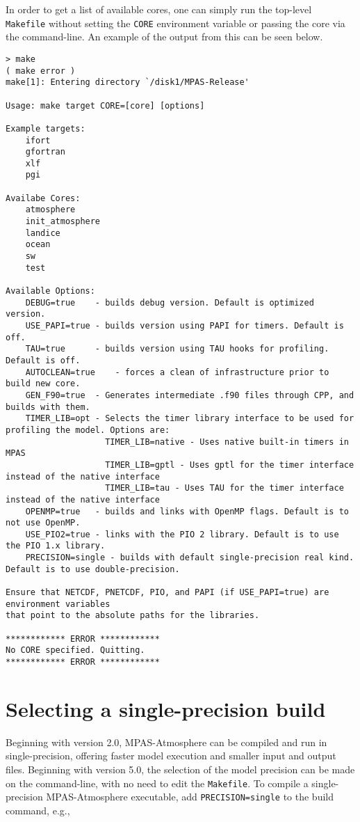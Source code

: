 In order to get a list of available cores, one can simply run the top-level {\tt
Makefile} without setting the {\tt CORE} environment variable or passing the
core via the command-line. An example of the output from this can be seen
below.

{\small
\begin{verbatim}
> make
( make error )
make[1]: Entering directory `/disk1/MPAS-Release'

Usage: make target CORE=[core] [options]

Example targets:
    ifort
    gfortran
    xlf
    pgi

Availabe Cores:
    atmosphere
    init_atmosphere
    landice
    ocean
    sw
    test

Available Options:
    DEBUG=true    - builds debug version. Default is optimized version.
    USE_PAPI=true - builds version using PAPI for timers. Default is off.
    TAU=true      - builds version using TAU hooks for profiling. Default is off.
    AUTOCLEAN=true    - forces a clean of infrastructure prior to build new core.
    GEN_F90=true  - Generates intermediate .f90 files through CPP, and builds with them.
    TIMER_LIB=opt - Selects the timer library interface to be used for profiling the model. Options are:
                    TIMER_LIB=native - Uses native built-in timers in MPAS
                    TIMER_LIB=gptl - Uses gptl for the timer interface instead of the native interface
                    TIMER_LIB=tau - Uses TAU for the timer interface instead of the native interface
    OPENMP=true   - builds and links with OpenMP flags. Default is to not use OpenMP.
    USE_PIO2=true - links with the PIO 2 library. Default is to use the PIO 1.x library.
    PRECISION=single - builds with default single-precision real kind. Default is to use double-precision.

Ensure that NETCDF, PNETCDF, PIO, and PAPI (if USE_PAPI=true) are environment variables
that point to the absolute paths for the libraries.

************ ERROR ************
No CORE specified. Quitting.
************ ERROR ************
\end{verbatim}
}

\section{Selecting a single-precision build}

Beginning with version 2.0, MPAS-Atmosphere can be compiled and run in single-precision, offering faster 
model execution and smaller input and output files. Beginning with version 5.0, the selection of the
model precision can be made on the command-line, with no need to edit the {\tt Makefile}.
To compile a single-precision MPAS-Atmosphere executable, add {\tt PRECISION=single} to the build command, e.g.,

